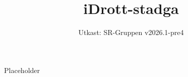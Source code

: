 \documentclass[a4paper]{dtek}
\title{iDrott-stadga}
\date{Utkast: SR-Gruppen v2026.1-pre4}
\begin{document}
Placeholder
\end{document}
